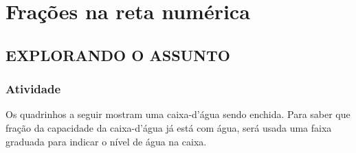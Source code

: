 




%

\setcounter{chapter}{2}
\chapter{Frações na reta numérica }
\setcounter{subsection}{0}
\section{EXPLORANDO O ASSUNTO }

\subsection{Atividade}

Os quadrinhos a seguir mostram uma caixa-d'água sendo enchida.
Para saber que fração da capacidade da caixa-d'água já está com água, será usada uma faixa graduada para indicar o nível de água na caixa.


